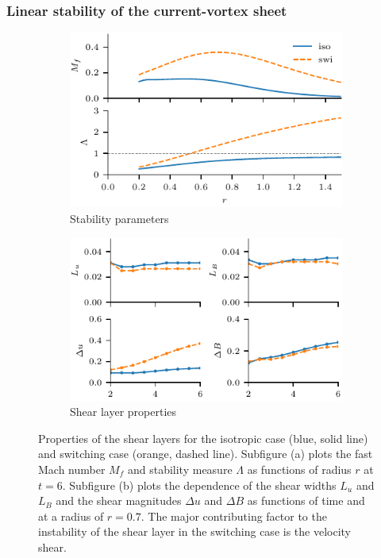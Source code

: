 \subsubsection{Linear stability of the current-vortex sheet}

\begin{figure}[t]
  \centering
    \begin{subfigure}{0.49\textwidth}
      \includegraphics[width=\linewidth]{v-4r-4_mach_t_6}
      \caption{Stability parameters}%
      \label{fig:v-4r-4_mach_t_6}
    \end{subfigure}
    \hfill
    \begin{subfigure}{0.49\textwidth}
      \includegraphics[width=\linewidth]{v-4r-4_layers_with_time}
      \caption{Shear layer properties}
      \label{fig:v-4r-4_layers_with_time}
    \end{subfigure}
\caption{Properties of the shear layers for the isotropic case (blue, solid line) and switching case (orange, dashed line). Subfigure (a) plots the fast Mach number $M_f$ and stability measure $\Lambda$ as functions of radius $r$ at $t=6$. Subfigure (b) plots the dependence of the shear widths $L_u$ and $L_B$ and the shear magnitudes $\Delta u$ and $\Delta B$ as functions of time and at a radius of $r=0.7$. The major contributing factor to the instability of the shear layer in the switching case is the velocity shear.}
\label{fig:v-4r-4_layers}%
\end{figure}

